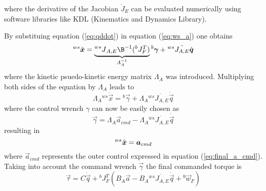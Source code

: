 where the derivative of the Jacobian $\dot{J}_{E}$ can be evaluated numerically
using software libraries like KDL (Kinematics and Dynamics Library).
\par
By substituing equation (\ref{eq:qddot}) in equation (\ref{eq:ws_a}) one obtains
\[
\prescript{ws}{}{\ddot{\vec{x}}} = \underbrace{\prescript{ws}{}{J}_{A,E} \B^{-1} ({}^b J_{F}^T)}_{\Lambda_A^{-1}} {}^b \vec{\gamma} + {}^{ws} \ddot{J_{A,E}} \dot{\vec{q}}
\]
where the kinetic psuedo-kinetic energy matrix $\Lambda_{A}$ was introduced. Multiplying both sides of the equation
by $\Lambda_{A}$ leads to
\[
\Lambda_A {}^{ws} \ddot{\vec{x}} =  {}^b \vec{\gamma} +  \Lambda_A  {}^{ws} \dot{J_{A,E}} \dot{\vec{q}}
\]
where the control wrench $\gamma$ can now be easily chosen as
\[\label{eq:gamma}
\vec{\gamma} = \Lambda_A \vec{a}_{cmd} - \Lambda_A {}^{ws} \dot{J_{A,E}} \dot{\vec{q}}
\]
resulting in
\[
\prescript{ws}{}{\ddot{\vec{x}}} = \vec{a}_{cmd}
\]
where $\vec{a}_{cmd}$ represents the outer control expressed in equation (\ref{eq:final_a_cmd}).
Taking into account the command wrench $\vec{\gamma}$ the final commanded torque is
\begin{equation}\label{eq:torque_wo_null}
  \vec{\tau} = C \dot{\vec{q}} + {}^{b}J^{T}_{F} ( B_A \vec{a} - B_A {}^{ws} \dot{J_{A,E}} \dot{\vec{q}} + {}^b\vec{w}_{F})
\end{equation}

